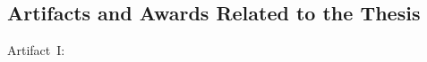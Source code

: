 \subsection*{Artifacts and Awards Related to the Thesis}
\begin{description}
  \item[Artifact~I:]
    \artifactIref
\end{description}
